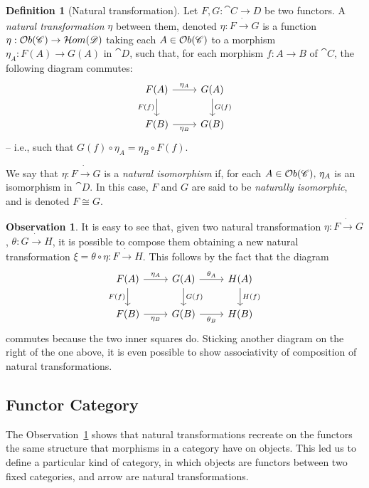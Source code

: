 \documentclass[a4paper, twoside,openright]{report}
\theoremstyle{plain}
\theoremstyle{definition}
\newtheorem{definition}[theorem]{Definition}
\newtheorem{obs}[theorem]{Observation}
\begin{document}
\begin{definition}[Natural transformation]
    Let $F,G : \cat {C \rightarrow D}$ be two functors. A \emph{natural transformation} $\eta$ between them, denoted $\eta: F \dot\rightarrow G$ is a function $\eta: \mathcal{O}b(\mathscr{C}) \rightarrow \mathcal{H}om(\mathscr{D})$ taking each $A \in \mathcal{O}b(\mathscr{C})$ to a morphism $\eta_A:F(A) \rightarrow G(A)$ in $\cat{D}$, such that, for each morphism $f: A \rightarrow B$ of $\cat C$, the following diagram commutes:
    \[
        \begin{tikzcd}
            F(A) \arrow[d, "F(f)" swap] \arrow[r, "{\eta_A}"] & G(A) \arrow[d, "G(f)"] \\
            F(B) \arrow[r, "{\eta_B}"swap] & G(B)
        \end{tikzcd}
    \]
    -- i.e., such that $G(f) \circ \eta_A = \eta_B \circ F(f)$.

    We say that $\eta: F \dot\rightarrow G$ is a \emph{natural isomorphism} if, for each $A \in \mathcal{O}b(\mathscr{C}) \text{, } \eta_A$ is an isomorphism in $\cat D$. In this case, $F$ and $G$ are said to be \emph{naturally isomorphic}, and is denoted $F \cong G$.    
\end{definition}

\begin{obs}\label{obs:comp_assoc_nat_tran}
It is easy to see that, given two natural transformation $\eta:F\dot\rightarrow G$, $\theta: G \dot\rightarrow H$, it is possible to compose them obtaining a new natural transformation $\xi = \theta \circ \eta : F \dot \rightarrow H$. This follows by the fact that the diagram
\[
        \begin{tikzcd}
            F(A) \arrow[d, "F(f)" swap] \arrow[r, "{\eta_A}"] 
                & G(A) \arrow[d, "G(f)"] \arrow[r, "{\theta_A}"]
                & H(A) \arrow[d, "H(f)"] \\
            F(B) \arrow[r, "{\eta_B}"swap]
                & G(B) \arrow[r, "{\theta_B}" swap]
                & H(B)
        \end{tikzcd}
\]
commutes because the two inner squares do. Sticking another diagram on the right of the one above, it is even possible to show associativity of composition of natural transformations.
\end{obs}

\subsection{Functor Category}

The Observation~\ref{obs:comp_assoc_nat_tran} shows that natural transformations recreate on the functors the same structure that morphisms in a category have on objects. This led us to define a particular kind of category, in which objects are functors between two fixed categories, and arrow are natural transformations.
\end{document}
